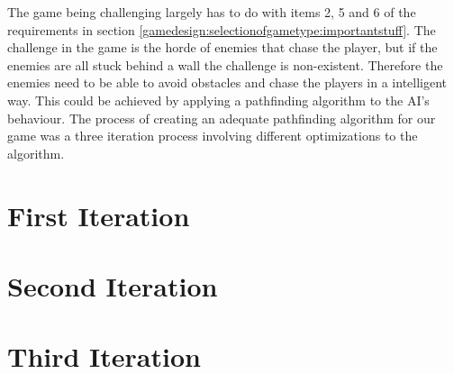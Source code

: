 The game being challenging largely has to do with items 2, 5 and 6 of the requirements in section \ref{gamedesign:selectionofgametype:importantstuff}.
The challenge in the game is the horde of enemies that chase the player, but if the enemies are all stuck behind a wall the challenge is non-existent.
Therefore the enemies need to be able to avoid obstacles and chase the players in a intelligent way.
This could be achieved by applying a pathfinding algorithm to the AI's behaviour.
The process of creating an adequate pathfinding algorithm for our game was a three iteration process involving different optimizations to the algorithm.

\section{First Iteration}

\section{Second Iteration}

\section{Third Iteration}

